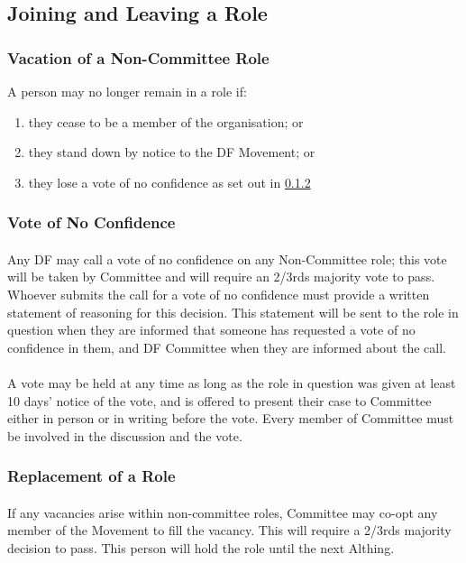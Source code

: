 \documentclass[a4paper, 11pt]{report}
\begin{document}
\subsection{Joining and Leaving a Role}
\subsubsection{Vacation of a Non-Committee Role}
A person may no longer remain in a role if:
\begin{enumerate}[\hspace{0.5cm}(a)]
\item they cease to be a member of the organisation; or
\item they stand down by notice to the DF Movement; or
\item they lose a vote of no confidence as set out in \ref{sec:noncomnocon}
\end{enumerate}

\subsubsection{Vote of No Confidence}
\label{sec:noncomnocon}
\paragraph{} Any DF may call a vote of no confidence on any Non-Committee role; this vote will be taken by Committee and will require an 2/3rds majority vote to pass. Whoever submits the call for a vote of no confidence must provide a written statement of reasoning for this decision. This statement will be sent to the role in question when they are informed that someone has requested a vote of no confidence in them, and DF Committee when they are informed about the call.
\paragraph{} A vote may be held at any time as long as the role in question was given at least 10 days’ notice of the vote, and is offered to present their case to Committee either in person or in writing before the vote. Every member of Committee must be involved in the discussion and the vote.

\subsubsection{Replacement of a Role}
\paragraph{} If any vacancies arise within non-committee roles, Committee may co-opt any member of the Movement to fill the vacancy. This will require a 2/3rds majority decision to pass. This person will hold the role until the next Althing.
\end{document}
